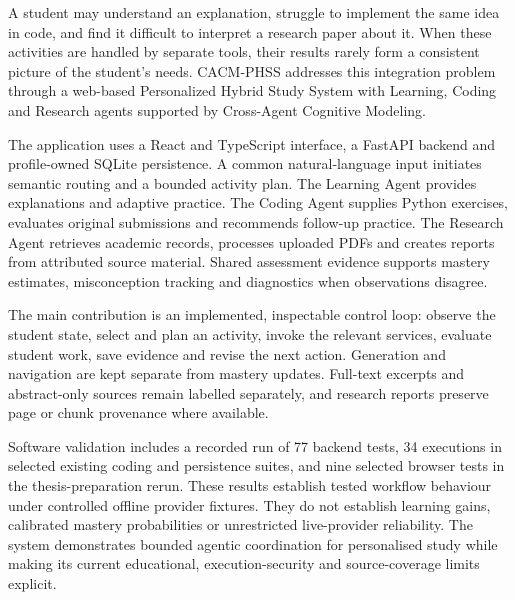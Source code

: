 A student may understand an explanation, struggle to implement the same idea in code, and find it difficult to interpret a research paper about it. When these activities are handled by separate tools, their results rarely form a consistent picture of the student's needs. CACM-PHSS addresses this integration problem through a web-based Personalized Hybrid Study System with Learning, Coding and Research agents supported by Cross-Agent Cognitive Modeling.

The application uses a React and TypeScript interface, a FastAPI backend and profile-owned SQLite persistence. A common natural-language input initiates semantic routing and a bounded activity plan. The Learning Agent provides explanations and adaptive practice. The Coding Agent supplies Python exercises, evaluates original submissions and recommends follow-up practice. The Research Agent retrieves academic records, processes uploaded PDFs and creates reports from attributed source material. Shared assessment evidence supports mastery estimates, misconception tracking and diagnostics when observations disagree.

The main contribution is an implemented, inspectable control loop: observe the student state, select and plan an activity, invoke the relevant services, evaluate student work, save evidence and revise the next action. Generation and navigation are kept separate from mastery updates. Full-text excerpts and abstract-only sources remain labelled separately, and research reports preserve page or chunk provenance where available.

Software validation includes a recorded run of 77 backend tests, 34 executions in selected existing coding and persistence suites, and nine selected browser tests in the thesis-preparation rerun. These results establish tested workflow behaviour under controlled offline provider fixtures. They do not establish learning gains, calibrated mastery probabilities or unrestricted live-provider reliability. The system demonstrates bounded agentic coordination for personalised study while making its current educational, execution-security and source-coverage limits explicit.
